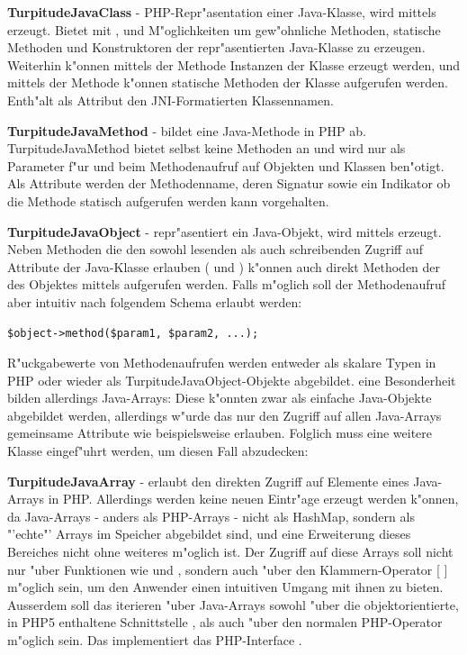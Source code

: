\textbf{TurpitudeJavaClass} - PHP-Repr"asentation einer Java-Klasse, wird mittels  erzeugt.
Bietet mit ,  und  M"oglichkeiten um gew"ohnliche Methoden, statische
Methoden und Konstruktoren der repr"asentierten Java-Klasse zu erzeugen. Weiterhin k"onnen mittels der Methode  Instanzen
der Klasse erzeugt werden, und mittels der Methode  k"onnen statische Methoden der Klasse aufgerufen werden.
Enth"alt als Attribut den JNI-Formatierten Klassennamen. 

\textbf{TurpitudeJavaMethod} - bildet eine Java-Methode in PHP ab. TurpitudeJavaMethod bietet selbst keine Methoden an und wird nur
als Parameter f"ur  und beim Methodenaufruf auf Objekten und Klassen ben"otigt.
Als Attribute werden der Methodenname, deren Signatur sowie ein Indikator ob die Methode statisch aufgerufen werden kann vorgehalten.

\textbf{TurpitudeJavaObject} - repr"asentiert ein Java-Objekt, wird mittels  erzeugt. Neben Methoden
die den sowohl lesenden als auch schreibenden Zugriff auf Attribute der Java-Klasse erlauben ( und ) k"onnen
auch direkt Methoden der des Objektes mittels  aufgerufen werden. Falls m"oglich soll der Methodenaufruf aber
intuitiv nach folgendem Schema erlaubt werden:
\begin{lstlisting}[caption=angestrebte Syntax zum Aufruf von Java-Methoden in PHP]
$object->method($param1, $param2, ...);
\end{lstlisting}
R"uckgabewerte von Methodenaufrufen werden entweder als skalare Typen in PHP oder wieder als TurpitudeJavaObject-Objekte abgebildet.
eine Besonderheit bilden allerdings Java-Arrays: Diese k"onnten zwar als einfache Java-Objekte abgebildet werden, allerdings w"urde das 
nur den Zugriff auf allen Java-Arrays gemeinsame Attribute wie beispielsweise  erlauben. Folglich muss eine weitere
Klasse eingef"uhrt werden, um diesen Fall abzudecken:

\textbf{TurpitudeJavaArray} - erlaubt den direkten Zugriff auf Elemente eines Java-Arrays in PHP. Allerdings werden keine neuen Eintr"age
erzeugt werden k"onnen, da Java-Arrays - anders als PHP-Arrays - nicht als HashMap, sondern als "'echte"' Arrays im Speicher abgebildet
sind, und eine Erweiterung dieses Bereiches nicht ohne weiteres m"oglich ist. Der Zugriff auf diese Arrays soll nicht nur "uber 
Funktionen wie  und , sondern auch "uber den Klammern-Operator [ ] m"oglich sein, um den Anwender einen
intuitiven Umgang mit ihnen zu bieten. Ausserdem soll das iterieren "uber Java-Arrays sowohl "uber die objektorientierte, in PHP5
enthaltene Schnittstelle , als auch "uber den normalen PHP-Operator  m"oglich sein. Das
 implementiert das PHP-Interface .

